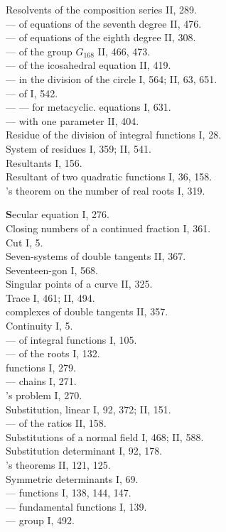 Resolvents of the composition series II, 289.\\
--- of equations of the seventh degree II, 476.\\
--- of equations of the eighth degree II, 308.\\
--- of the group $G_{168}$ II, 466, 473.\\
--- of the icosahedral equation II, 419.\\
--- in the division of the circle I, 564; II, 63, 651.\\
--- of  I, 542.\\
--- --- for metacyclic. equations I, 631.\\
--- with one parameter II, 404.\\
Residue of the division of integral functions I, 28.\\
System of residues I, 359; II, 541.\\
Resultants I, 156.\\
Resultant of two quadratic functions I, 36, 158.\\
's theorem on the number of real roots I, 319.

\medskip
\noindent
\textbf{S}ecular equation I, 276.\\
Closing numbers of a continued fraction I, 361.\\
Cut I, 5.\\
Seven-systems of double tangents II, 367.\\
Seventeen-gon I, 568.\\
Singular points of a curve II, 325.\\
Trace I, 461; II, 494.\\
 complexes of double tangents II, 357.\\
Continuity I, 5.\\
--- of integral functions I, 105.\\
--- of the roots I, 132.\\
 functions I, 279.\\
--- chains I, 271.\\
's problem I, 270.\\
Substitution, linear I, 92, 372; II, 151.\\
--- of the ratios II, 158.\\
Substitutions of a normal field I, 468; II, 588.\\
Substitution determinant I, 92, 178.\\
's theorems II, 121, 125.\\
Symmetric determinants I, 69.\\
--- functions I, 138, 144, 147.\\
--- fundamental functions I, 139.\\
--- group I, 492.
